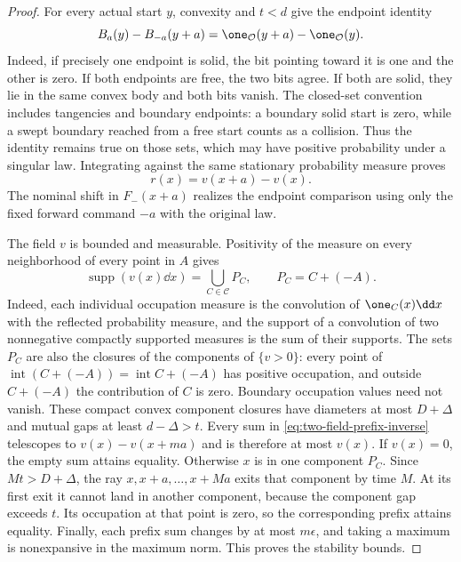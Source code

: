 \begin{proof}
For every actual start $y$, convexity and $t<d$ give the
endpoint identity
\begin{equation}\label{eq:two-field-bit-identity}
 B_a(y)-B_{-a}(y+a)
                  =\one_{\mathcal O}(y+a)-\one_{\mathcal O}(y).
\end{equation}
Indeed, if precisely one endpoint is solid, the bit pointing toward
it is one and the other is zero.  If both endpoints are free, the
two bits agree.  If both are solid, they lie in the same convex
body and both bits vanish.  The closed-set convention includes
tangencies and boundary endpoints: a boundary solid start is
zero, while a swept boundary reached from a free start counts as
a collision.  Thus the identity remains true on those sets,
which may have positive probability under a singular law.
Integrating against the same stationary probability measure proves
\begin{equation}\label{eq:two-field-occupation-increment}
                         r(x)=v(x+a)-v(x).
\end{equation}
The nominal shift in $F_-(x+a)$ realizes the endpoint comparison
using only the fixed forward command $-a$ with the original law.

The field $v$ is bounded and measurable.  Positivity of the measure
on every neighborhood of every point in $A$ gives
\begin{equation}\label{eq:two-field-occupation-components}
 \operatorname{supp}(v(x)\dd x)=\bigcup_{C\in\mathcal C}P_C,
 \qquad P_C=C+(-A).
\end{equation}
Indeed, each individual occupation measure is the convolution
of $\one_C(x)\dd x$ with the reflected probability measure,
and the support of a convolution of two nonnegative compactly
supported measures is the sum of their supports.  The sets $P_C$
are also the closures of the components of $\{v>0\}$:
every point of $\operatorname{int}(C+(-A))=\operatorname{int}C+(-A)$
has positive occupation, and outside $C+(-A)$ the contribution
of $C$ is zero.  Boundary occupation values need not vanish.
These compact convex component closures have diameters at most
$D+\Delta$ and mutual gaps at least $d-\Delta>t$.
Every sum in \eqref{eq:two-field-prefix-inverse} telescopes to
$v(x)-v(x+ma)$ and is therefore at most $v(x)$.
If $v(x)=0$, the empty sum attains equality.  Otherwise $x$ is in
one component $P_C$.  Since $Mt>D+\Delta$, the ray
$x,x+a,\ldots,x+Ma$ exits that component by time $M$.
At its first exit it cannot land in another component, because
the component gap exceeds $t$.  Its occupation at that point is
zero, so the corresponding prefix attains equality.
Finally, each prefix sum changes by at most $m\epsilon$, and
taking a maximum is nonexpansive in the maximum norm.  This proves
the stability bounds.
\end{proof}

